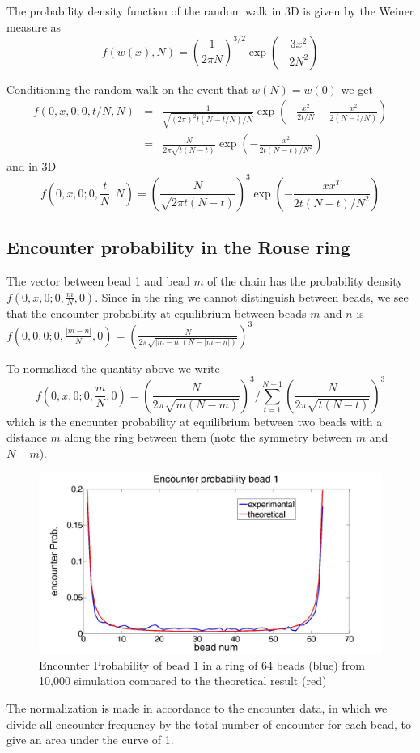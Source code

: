 \documentclass{report}
\begin{document}
The probability density function of the random walk in 3D is given by the Weiner measure as  
\begin{equation*}
f(w(x),N)=\left( \frac{1}{2\pi N}\right)^{3/2}\exp(-\frac{3x^2}{2N^2})
\end{equation*}

Conditioning the random walk on the event that $w(N)=w(0)$ we get 
\begin{eqnarray*}
f(0,x,0;0,t/N,N)&=&\frac{1}{\sqrt{(2\pi)^2 t(N-t/N)/N}}\exp(-\frac{x^2}{2t/N}-\frac{x^2}{2(N-t/N)})\\
&=&\frac{N}{2\pi\sqrt{t(N-t)}} \exp(-\frac{x^2}{2t(N-t)/N^2})
\end{eqnarray*}
and in 3D
\begin{equation*}
f(0,x,0;0,\frac{t}{N},N) = \left(\frac{N}{\sqrt{2\pi t(N-t)}}\right)^3 \exp\left(-\frac{xx^T}{2t(N-t)/N^2}\right)
\end{equation*}

\subsection{Encounter probability in the Rouse ring}\label{subsection_encounterProbabilityInTheRing}
The vector between bead 1 and bead $m$ of the chain has the probability density 
$f(0,x,0;0,\frac{m}{N},0)$. Since in the ring we cannot distinguish between beads, we see that the encounter probability at equilibrium between beads $m$ and $n$ is 
$f(0,0,0;0,\frac{|m-n|}{N},0)=\left(\frac{N}{2\pi \sqrt{|m-n|(N-|m-n|)}}\right)^3$

To normalized the quantity above we write 
\begin{equation*}
f(0,x,0;0,\frac{m}{N},0)=\left(\frac{N}{2\pi\sqrt{m(N-m)}}\right)^3 /\sum_{t=1}^{N-1}\left(\frac{N}{2\pi\sqrt{t(N-t)}}\right)^3 
\end{equation*}
which is the encounter probability at equilibrium between two beads with a distance $m$ along the ring between them (note the symmetry between $m$ and $N-m$). 

\begin{figure}[h!]
\includegraphics[scale=0.2]{encounterProbBead1InLoopOf64BeadsSimpleRouse}\caption{Encounter Probability of bead 1 in a ring of 64 beads (blue) from 10,000 simulation compared to the theoretical result (red)}\label{figure_rouseRingEncounterProbabilityComparisionToTheory}
\end{figure}
The normalization is made in accordance to the encounter data, in which we divide all encounter frequency by the total number of encounter for each bead, to give an area under the curve of 1. 
\end{document}
